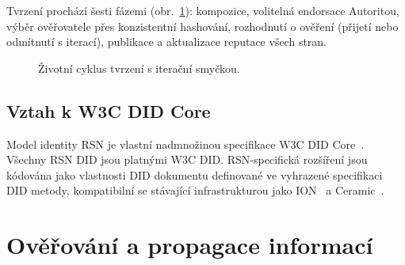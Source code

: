 \documentclass[11pt,a4paper,twocolumn]{article}
\begin{document}
Tvrzení prochází šesti fázemi (obr.~\ref{fig:lifecycle}): kompozice, volitelná endorsace Autoritou, výběr ověřovatele přes konzistentní hashování, rozhodnutí o ověření (přijetí nebo odmítnutí s iterací), publikace a aktualizace reputace všech stran.

\begin{figure}[ht]
\centering
{}
\caption{Životní cyklus tvrzení s iterační smyčkou.}
\label{fig:lifecycle}
\end{figure}

\subsection{Vztah k W3C DID Core}

Model identity RSN je vlastní nadmnožinou specifikace W3C DID Core~\cite{did2022}. Všechny RSN DID jsou platnými W3C DID. RSN-specifická rozšíření jsou kódována jako vlastnosti DID dokumentu definované ve vyhrazené specifikaci DID metody, kompatibilní se stávající infrastrukturou jako ION~\cite{buchner2021} a Ceramic~\cite{ceramic2023}.

\section{Ověřování a propagace informací}
\end{document}
